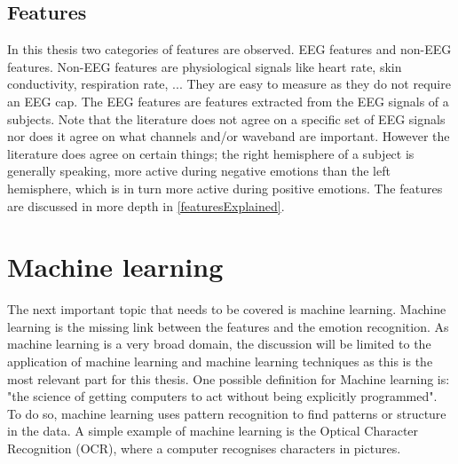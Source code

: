 
\subsection{Features}
In this thesis two categories of features are observed. EEG features and non-EEG features. Non-EEG features are physiological signals like heart rate, skin conductivity, respiration rate, ... They are easy to measure as they do not require an EEG cap. The EEG features are features extracted from the EEG signals of a subjects. Note that the literature does not agree on a specific set of EEG signals nor does it agree on what channels and/or waveband are important. However the literature does agree on certain things; the right hemisphere of a subject is generally speaking, more active during negative emotions than the left hemisphere, which is in turn more active during positive emotions\cite{RealTimeEEGEmotion,EEGDatasets,killyPaper}. The features are discussed in more depth in \ref{featuresExplained}.

\section{Machine learning}
The next important topic that needs to be covered is machine learning. Machine learning is the missing link between the features and the emotion recognition. As machine learning is a very broad domain, the discussion will be limited to the application of machine learning and machine learning techniques as this is the most relevant part for this thesis. One possible definition for Machine learning is: "the science of getting computers to act without being explicitly programmed". To do so, machine learning uses pattern recognition to find patterns or structure in the data. A simple example of machine learning is the Optical Character Recognition (OCR), where a computer recognises characters in pictures.

\npar

